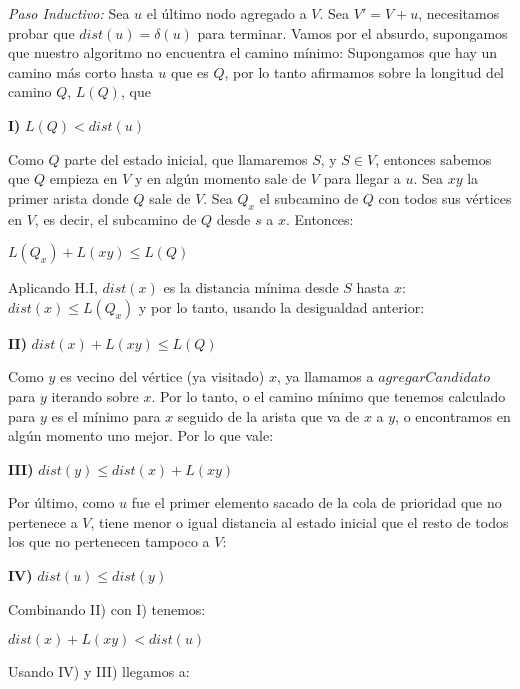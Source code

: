 \emph{Paso Inductivo:} Sea $u$ el último nodo agregado a $V$. Sea $V'= V + u$, necesitamos probar que $dist(u) = \delta(u)$ para terminar. Vamos por el absurdo, supongamos que nuestro algoritmo no encuentra el camino mínimo: Supongamos que hay un camino más corto hasta $u$ que es $Q$, por lo tanto afirmamos sobre la longitud del camino $Q$, $L(Q)$, que
\\
\begin{center}
\textbf{I)} $L(Q) < dist(u)$
\\
\end{center}
Como $Q$ parte del estado inicial, que llamaremos $S$, y $S \in V$, entonces sabemos que $Q$ empieza en $V$ y en algún momento sale de $V$ para llegar a $u$. Sea $xy$ la primer arista donde $Q$ sale de $V$. Sea $Q_x$ el subcamino de $Q$ con todos sus vértices en $V$, es decir, el subcamino de $Q$ desde $s$ a $x$. Entonces:
\\
\begin{center}
$L(Q_x)+L(xy) \leq L(Q)$
\\
\end{center}
Aplicando H.I, $dist(x)$ es la distancia mínima desde $S$ hasta $x$: $dist(x) \leq L(Q_x)$ y por lo tanto, usando la desigualdad anterior:
\\
\begin{center}
\textbf{II)} $dist(x)+L(xy) \leq L(Q) $
\\
\end{center}
Como $y$ es vecino del vértice (ya visitado) $x$, ya llamamos a $agregarCandidato$ para $y$ iterando sobre $x$. Por lo tanto, o el camino mínimo que tenemos calculado para $y$ es el mínimo para $x$ seguido de la arista que va de $x$ a $y$, o encontramos en algún momento uno mejor. Por lo que vale:
\\
\begin{center}
\textbf{III)} $dist(y) \leq dist(x) + L(xy)$
\\
\end{center}
Por último, como $u$ fue el primer elemento sacado de la cola de prioridad que no pertenece a $V$, tiene menor o igual distancia al estado inicial que el resto de todos los que no pertenecen tampoco a $V$:
\\
\begin{center}
\textbf{IV)} $dist(u) \le dist(y) $
\\
\end{center}
Combinando II) con I) tenemos:
\\
\begin{center}
$dist(x)+L(xy) < dist(u)$
\\
\end{center}
Usando IV) y III) llegamos a:
\\

